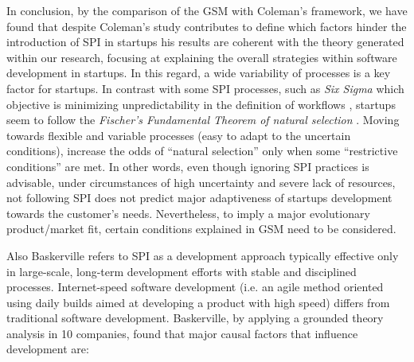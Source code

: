 \documentclass[10pt,journal,letterpaper,compsoc]{IEEEtran}
\begin{document}
In conclusion, by the comparison of the GSM with Coleman's framework, we have
found that despite Coleman's study contributes to define which factors hinder
the introduction of SPI in startups 
his results are coherent with the theory generated within our research, focusing
at explaining the overall strategies within software development in startups.
In this regard, a wide variability of processes is a key factor for startups.  
In contrast with some SPI processes, such as \textit{Six Sigma} which objective 
is minimizing unpredictability in the definition of workflows \cite{Sixsigma}, 
startups seem to follow the \textit{Fischer's Fundamental Theorem of natural  
selection} \cite{Fisher}.
Moving towards flexible and variable processes (easy  to adapt to the uncertain
conditions), increase the odds of ``natural  selection'' only when some
``restrictive conditions'' are met. In other words, even though ignoring SPI
practices is advisable, under circumstances of high uncertainty and severe lack
of resources, %
not following SPI does not predict
major adaptiveness of startups development towards the customer's needs.
Nevertheless, to imply a major evolutionary product/market fit, certain
conditions explained in GSM need to be considered.



Also Baskerville \cite{Internet} refers to SPI as a development approach
typically effective only in large-scale, long-term development efforts with
stable and disciplined processes. Internet-speed software development (i.e. an
agile method oriented using daily builds aimed at developing a product with high
speed) differs from traditional software development. Baskerville, by applying a
grounded theory analysis in 10 companies, found that major causal factors that
influence development are:
\end{document}
